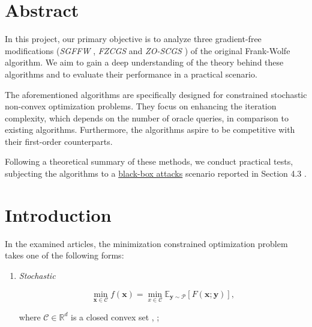  



\newpage

\begin{multicols}{2} %

\section*{Abstract}

In this project, our primary objective is to analyze three gradient-free modifications 
(\textit{SGFFW} \cite{sahu19a}, \textit{FZCGS} \cite{gao20b} and \textit{ZO-SCGS} \cite{lobanov2023})
of the original Frank-Wolfe algorithm. We aim to gain a deep understanding of 
the theory behind these algorithms and to evaluate their performance in a
practical scenario. 

The aforementioned algorithms are specifically designed for constrained 
stochastic non-convex optimization problems. They focus on enhancing the iteration complexity, 
which depends on the number of oracle queries, in comparison to existing algorithms. 
Furthermore, the algorithms aspire to be competitive with their first-order counterparts.

Following a theoretical summary of these methods, we conduct practical tests, 
subjecting the algorithms to a \href{https://github.com/IBM/ZOSVRG-BlackBox-Adv}{black-box attacks} 
scenario reported in Section 4.3 \cite{gao20b}.



\section{Introduction}

In the examined articles, the minimization constrained optimization 
problem takes one of the following forms:

\begin{enumerate}
    \item \textit{Stochastic} 

    \begin{equation}
    \min _{\mathbf{x} \in \mathcal{C}} f(\mathbf{x})=\min _{x \in \mathcal{C}} \mathbb{E}_{\mathbf{y} \sim \mathcal{P}}[F(\mathbf{x} ; \mathbf{y})], 
    \label{eq:stochastic}
    \end{equation}

    where $\mathcal{C} \in \mathbb{R}^d$ is a closed convex set \cite{sahu19a}, \cite{lobanov2023};
    

\end{enumerate}
\end{multicols}
